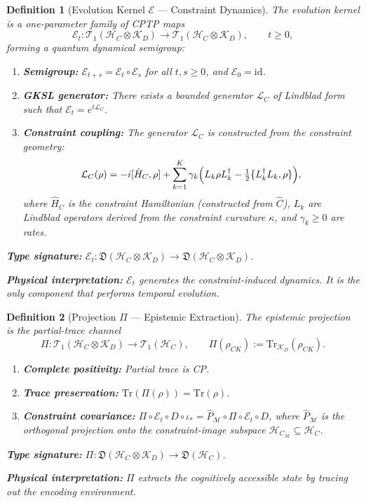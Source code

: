 \documentclass[11pt,a4paper]{article}
\newtheorem{definition}{Definition}[section]
\theoremstyle{remark}
\newcommand{\CM}{\mathcal{M}}
\newcommand{\HC}{\mathcal{H}_C}
\newcommand{\CL}{\mathcal{L}}
\newcommand{\hatC}{\hat{C}}
\newcommand{\hatH}{\hat{H}}
\newcommand{\hatP}{\hat{P}}
\newcommand{\id}{\mathrm{id}}
\newcommand{\Tr}{\mathrm{Tr}}
\begin{document}
\begin{definition}[Evolution Kernel $\mathcal{E}$ --- Constraint Dynamics]
\label{def:evolution_kernel}
The \emph{evolution kernel} is a one-parameter family of CPTP maps
\[
  \mathcal{E}_t:
    \mathcal{T}_1(\HC \otimes \mathcal{K}_D)
    \longrightarrow
    \mathcal{T}_1(\HC \otimes \mathcal{K}_D),
  \qquad t \geq 0,
\]
forming a quantum dynamical semigroup:
\begin{enumerate}[label=(E\arabic*)]
  \item \textbf{Semigroup:}
    $\mathcal{E}_{t+s} = \mathcal{E}_t \circ \mathcal{E}_s$ for all
    $t, s \geq 0$, and $\mathcal{E}_0 = \id$.
  \item \textbf{GKSL generator:} There exists a bounded generator
    $\CL_C$ of Lindblad form such that $\mathcal{E}_t = e^{t\CL_C}$.
  \item \textbf{Constraint coupling:} The generator $\CL_C$ is
    constructed from the constraint geometry:
    \begin{equation}
    \label{eq:lindblad_gen}
      \CL_C(\rho) =
        -i[\hatH_C, \rho]
        + \sum_{k=1}^{K}
          \gamma_k \Bigl(
            L_k \rho L_k^\dagger
            - \tfrac{1}{2}\{L_k^\dagger L_k, \rho\}
          \Bigr),
    \end{equation}
    where $\hatH_C$ is the constraint Hamiltonian (constructed from
    $\hatC$), $L_k$ are Lindblad operators derived from the constraint
    curvature $\kappa$, and $\gamma_k \geq 0$ are rates.
\end{enumerate}
\textbf{Type signature:}
$\mathcal{E}_t: \mathfrak{D}(\HC \otimes \mathcal{K}_D) \to
               \mathfrak{D}(\HC \otimes \mathcal{K}_D)$.

\textbf{Physical interpretation:} $\mathcal{E}_t$ generates the
constraint-induced dynamics.  It is the \emph{only} component that
performs temporal evolution.
\end{definition}

\begin{definition}[Projection $\Pi$ --- Epistemic Extraction]
\label{def:projection}
The \emph{epistemic projection} is the partial-trace channel
\[
  \Pi: \mathcal{T}_1(\HC \otimes \mathcal{K}_D)
       \longrightarrow
       \mathcal{T}_1(\HC),
  \qquad
  \Pi(\rho_{CK}) := \Tr_{\mathcal{K}_D}(\rho_{CK}).
\]
\begin{enumerate}[label=($\Pi$\arabic*)]
  \item \textbf{Complete positivity:} Partial trace is CP.
  \item \textbf{Trace preservation:} $\Tr(\Pi(\rho)) = \Tr(\rho)$.
  \item \textbf{Constraint covariance:}
    $\Pi \circ \mathcal{E}_t \circ D \circ \iota_* =
     \hatP_\CM \circ \Pi \circ \mathcal{E}_t \circ D$,
    where $\hatP_\CM$ is the orthogonal projection onto the
    constraint-image subspace $\HC_\CM \subseteq \HC$.
\end{enumerate}
\textbf{Type signature:}
$\Pi: \mathfrak{D}(\HC \otimes \mathcal{K}_D) \to \mathfrak{D}(\HC)$.

\textbf{Physical interpretation:} $\Pi$ extracts the cognitively
accessible state by tracing out the encoding environment.
\end{definition}
\end{document}
